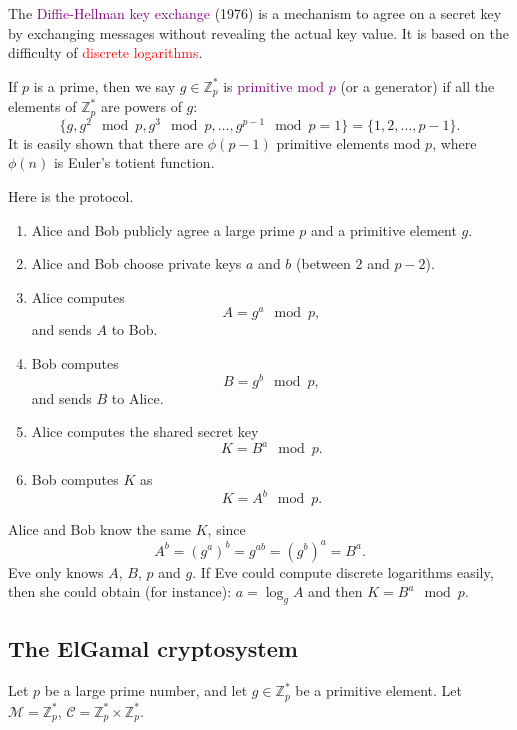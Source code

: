 \documentclass[a4paper, 11pt, openany]{book}
\numberwithin{equation}{section}
\theoremstyle{plain}
\theoremstyle{definition}
\newcommand{\Z}{\mathbb{Z}}
\newcommand{\Important}[1]{\textcolor{red}{#1}}
\newcommand{\Define}[1]{\textcolor{purple}{#1}}
\begin{document}
The \Define{Diffie-Hellman key exchange} (1976) is a mechanism to agree on a secret key by exchanging messages without revealing the actual key value. It is based on the difficulty of \Important{discrete logarithms}.

If $p$ is a prime, then we say $g \in \Z_p^*$ is \Define{primitive mod $p$} (or a generator) if all the elements of $\Z_p^*$ are powers of $g$:
\[
    \{g, g^2 \mod p, g^3 \mod p, \dots, g^{p-1} \mod p = 1  \} = \{1, 2, \dots, p-1 \}.
\]
It is easily shown that there are $\phi(p-1)$ primitive elements mod $p$, where $\phi(n)$ is Euler's totient function.

Here is the protocol.
\begin{enumerate}
    \item Alice and Bob publicly agree a large prime $p$ and a primitive element $g$. 

    \item Alice and Bob choose private keys $a$ and $b$ (between $2$ and $p-2$).
    
    \item Alice computes 
    \[
        A = g^a \mod p,
    \]
    and sends $A$ to Bob.
    
    \item Bob computes 
    \[
        B = g^b \mod p,
    \]
    and sends $B$ to Alice.
    
    \item Alice computes the shared secret key 
    \[
        K = B^a \mod p.
    \]
    
    \item Bob computes $K$ as 
    \[
        K = A^b \mod p.
    \]
\end{enumerate}


Alice and Bob know the same $K$, since 
\[
    A^b = (g^a)^b = g^{ab} = (g^b)^a = B^a.
\]
Eve only knows $A$, $B$, $p$ and $g$. If Eve could compute discrete logarithms easily, then she could obtain (for instance): $a = \log_g A$ and then $K = B^a \mod p$.


\subsection{The ElGamal cryptosystem}


Let $p$ be a large prime number, and let $g \in \Z_p^*$ be a primitive element. Let $\mathcal{M} = \Z_p^*$, $\mathcal{C} = \Z_p^* \times \Z_p^*$.
\end{document}
